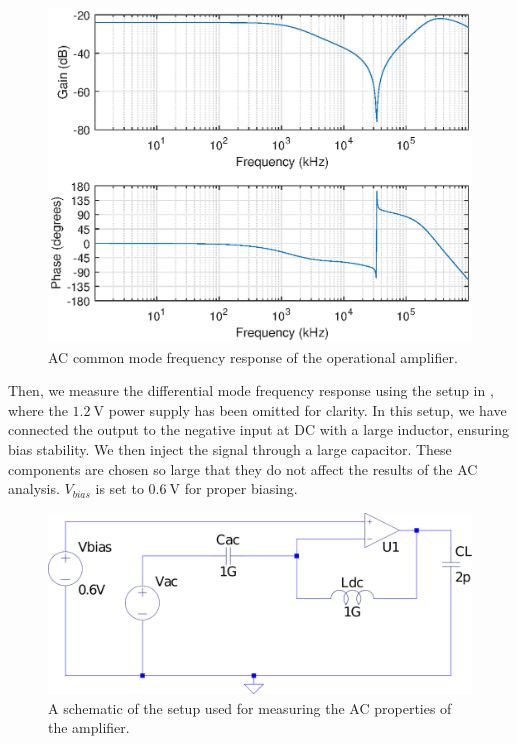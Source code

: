 \documentclass[journal,hidelinks]{IEEEtran}
\begin{document}
\begin{figure}[!htb]
  \centering
  \includegraphics[width=\columnwidth]{ac_cm.eps}
  \caption{AC common mode frequency response of the operational amplifier.}
  \label{fig:ac_cm}
\end{figure}

Then, we measure the differential mode frequency response using the setup in , where the $\SI{1.2}{\volt}$ power supply has been omitted for clarity. In this setup, we have connected the output to the negative input at DC with a large inductor, ensuring bias stability. We then inject the signal through a large capacitor. These components are chosen so large that they do not affect the results of the AC analysis. $V_{bias}$ is set to $\SI{0.6}{\volt}$ for proper biasing.

\begin{figure}[!htb]
  \centering
  \includegraphics[width=\columnwidth]{ac_setup.pdf}
  \caption{A schematic of the setup used for measuring the AC properties of the amplifier.}
  \label{fig:ac_setup}
\end{figure}
\end{document}
